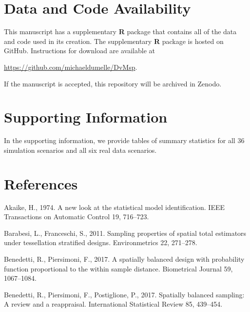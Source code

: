 \documentclass[]{elsarticle} %
\begin{document}
\hypertarget{data-and-code-availability}{%
\section*{Data and Code Availability}\label{data-and-code-availability}}

This manuscript has a supplementary \textbf{\textsf{R}} package that
contains all of the data and code used in its creation. The
supplementary \textbf{\textsf{R}} package is hosted on GitHub.
Instructions for download are available at

\url{https://github.com/michaeldumelle/DvMsp}.

If the manuscript is accepted, this repository will be archived in
Zenodo.

\hypertarget{supporting-information}{%
\section*{Supporting Information}\label{supporting-information}}

In the supporting information, we provide tables of summary statistics
for all 36 simulation scenarios and all six real data scenarios.

\hypertarget{references}{%
\section*{References}\label{references}}

\hypertarget{refs}{}
\leavevmode\hypertarget{ref-akaike1974new}{}%
Akaike, H., 1974. A new look at the statistical model identification.
IEEE Transactions on Automatic Control 19, 716--723.

\leavevmode\hypertarget{ref-barabesi2011sampling}{}%
Barabesi, L., Franceschi, S., 2011. Sampling properties of spatial total
estimators under tessellation stratified designs. Environmetrics 22,
271--278.

\leavevmode\hypertarget{ref-benedetti2017spatially}{}%
Benedetti, R., Piersimoni, F., 2017. A spatially balanced design with
probability function proportional to the within sample distance.
Biometrical Journal 59, 1067--1084.

\leavevmode\hypertarget{ref-benedetti2017spatiallyreview}{}%
Benedetti, R., Piersimoni, F., Postiglione, P., 2017. Spatially balanced
sampling: A review and a reappraisal. International Statistical Review
85, 439--454.
\end{document}
